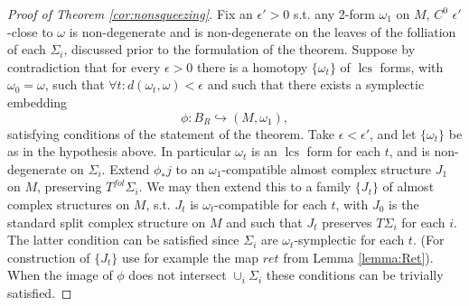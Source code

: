 \documentclass{amsart}
\numberwithin{equation}{section}
\newtheorem{theorem}[equation]{Theorem}
\theoremstyle{definition}
\theoremstyle{remark}
\DeclareMathOperator{\lcs}{lcs}
\begin{document}
\begin{proof} [Proof of Theorem \ref{cor:nonsqueezing}] \label{section:proofnonsqueezing}
 Fix an $\epsilon' >0$ s.t. any 2-form $\omega _{1}  $ on $M$, $C ^{0} $ $\epsilon'$-close to $\omega$ is non-degenerate and is non-degenerate on the leaves of the folliation of each $\Sigma _{i} $, discussed prior to the formulation of the theorem. Suppose by contradiction that for every $\epsilon>0$ there is a homotopy $\{\omega _{t} \}$ of $\lcs$ forms, with $\omega _{0}=\omega$, such that $\forall t: d(\omega_{t}, \omega) < \epsilon$ and such that 
there exists a symplectic embedding $$\phi: B _{R}  \hookrightarrow (M, \omega _{1}), $$  satisfying conditions of the statement of the theorem.
Take $\epsilon<\epsilon'$, and let $\{\omega _{t} \}$ be as in the hypothesis above. In particular $\omega _{t} $ is an $\lcs$ form for each $t$, and is non-degenerate on $\Sigma _{i} $.
    Extend $\phi _{*}j $ to an $\omega _{1} $-compatible almost complex structure $J _{1} $ on $M$, preserving $T ^{fol}  \Sigma _{i} $.
   We may then extend this to a family $\{J _{t} \}  $ of almost complex structures on $M$, s.t. $J _{t} $ is $\omega _{t}  $-compatible for each $t$, with $J _{0} $ is the standard split complex structure on $M$ and such that $J _{t} $ preserves $T\Sigma _{i} $ for each $i$. The latter condition can be satisfied since $\Sigma _{i} $ are $\omega _{t} $-symplectic for each $t$. (For construction of $\{J _{t} \}$ use for example the map $ret$ from Lemma \ref{lemma:Ret}). When the image of $\phi$ does not intersect $\cup _{i} \Sigma _{i} $ these conditions can be trivially satisfied. 


\end{proof}
\end{document}
